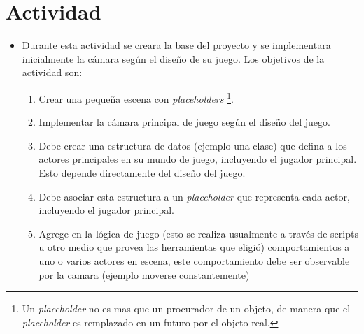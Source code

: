 \section{Actividad}
\begin{itemize}
\item Durante esta actividad se creara la base del proyecto y se implementara inicialmente la cámara según el diseño de su juego. Los objetivos de la actividad son:
\begin{enumerate}
  \item Crear una pequeña escena con \emph{placeholders} \footnote{Un \emph{placeholder} no es mas que un procurador de un objeto, de manera que el \emph{placeholder} es remplazado en un futuro por el objeto real.}.
  \item Implementar la cámara principal de juego según el diseño del juego.
  \item Debe crear una estructura de datos (ejemplo una clase) que defina a los actores principales en su mundo de juego, incluyendo el jugador principal. Esto depende directamente del diseño del juego.
  \item Debe asociar esta estructura a un \emph{placeholder} que representa cada actor, incluyendo el jugador principal.
  \item Agrege en la lógica de juego (esto se realiza usualmente a través de scripts u otro medio que provea las herramientas que eligió) comportamientos a uno o varios actores en escena, este comportamiento debe ser observable por la camara (ejemplo moverse constantemente)
\end{enumerate}
\end{itemize}